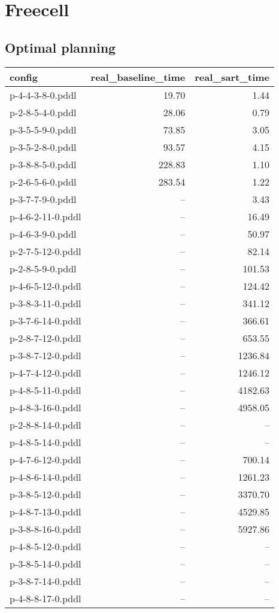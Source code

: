 \documentclass{article}
\begin{document}
                \newpage \section{Freecell}
                    \subsection*{Optimal planning}
                    
                            \begin{center}
                            \scriptsize
                            \begin{tabular}{@{}l|r|r@{}}
                            config & real\_baseline\_time & real\_sart\_time\\\midrule
                             p-4-4-3-8-0.pddl&19.70&1.44\\
 p-2-8-5-4-0.pddl&28.06&0.79\\
 p-3-5-5-9-0.pddl&73.85&3.05\\
 p-3-5-2-8-0.pddl&93.57&4.15\\
 p-3-8-8-5-0.pddl&228.83&1.10\\
 p-2-6-5-6-0.pddl&283.54&1.22\\
 p-3-7-7-9-0.pddl&--&3.43\\
 p-4-6-2-11-0.pddl&--&16.49\\
 p-4-6-3-9-0.pddl&--&50.97\\
 p-2-7-5-12-0.pddl&--&82.14\\
 p-2-8-5-9-0.pddl&--&101.53\\
 p-4-6-5-12-0.pddl&--&124.42\\
 p-3-8-3-11-0.pddl&--&341.12\\
 p-3-7-6-14-0.pddl&--&366.61\\
 p-2-8-7-12-0.pddl&--&653.55\\
 p-3-8-7-12-0.pddl&--&1236.84\\
 p-4-7-4-12-0.pddl&--&1246.12\\
 p-4-8-5-11-0.pddl&--&4182.63\\
 p-4-8-3-16-0.pddl&--&4958.05\\
 p-2-8-8-14-0.pddl&--&--\\
 p-4-8-5-14-0.pddl&--&--\\
 p-4-7-6-12-0.pddl&--&700.14\\
 p-4-8-6-14-0.pddl&--&1261.23\\
 p-3-8-5-12-0.pddl&--&3370.70\\
 p-4-8-7-13-0.pddl&--&4529.85\\
 p-3-8-8-16-0.pddl&--&5927.86\\
 p-4-8-5-12-0.pddl&--&--\\
 p-3-8-5-14-0.pddl&--&--\\
 p-3-8-7-14-0.pddl&--&--\\
 p-4-8-8-17-0.pddl&--&--
                            \end{tabular}
                            \end{center}
                    
\end{document}
